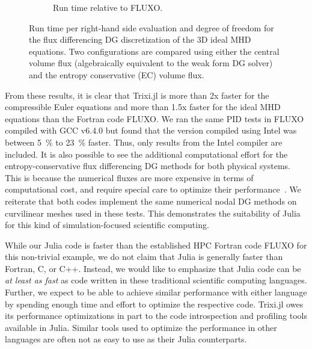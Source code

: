 \documentclass[hidelinks]{juliacon} %
\newcommand{\trixi}{Trixi.jl\xspace}
\begin{document}
\begin{figure}[!ht]
\begin{subfigure}{\linewidth}
    \caption{Run time relative to FLUXO.}
  \end{subfigure}%
  \caption{Run time per right-hand side evaluation and degree of freedom for
           the flux differencing DG discretization of the 3D ideal MHD equations.
           Two configurations are compared using either the central volume flux
           (algebraically equivalent to the weak form DG solver) and the entropy
           conservative (EC) volume flux.}
  \label{fig:PID-MHD}
\end{figure}

From these results, it is clear that \trixi is more than 2x faster for the compressible Euler equations
and more than 1.5x faster for the ideal MHD equations than the Fortran code FLUXO.
We ran the same PID tests in FLUXO compiled with GCC v6.4.0 but found that
the version compiled using Intel was between \SI{5}{\percent} to \SI{23}{\percent} faster.
Thus, only results from the Intel compiler are included.
It is also possible to see the additional computational effort for the entropy-conservative flux
differencing DG methods for both physical systems. This is because the numerical fluxes are more
expensive in
terms of computational cost, and require special care to optimize their performance~\cite{hendrik_blog}.
We reiterate that both codes implement the same numerical nodal DG methods on curvilinear meshes used in these tests.
This demonstrates the suitability of Julia for this kind of simulation-focused scientific computing.

While our Julia code is faster than the established HPC Fortran code FLUXO for this non-trivial
example, we do not claim that Julia is generally faster than Fortran, C, or C++.
Instead, we would like to emphasize that Julia code can be \emph{at least
as fast} as code written in these traditional scientific computing languages.
Further, we expect to be able to achieve similar performance with either language
by spending enough time and effort to optimize the respective code.
\trixi owes its performance optimizations in part to the code introspection and
profiling tools available in Julia. Similar tools used to optimize the performance in other
languages are often not as easy to use as their Julia counterparts.
\end{document}
